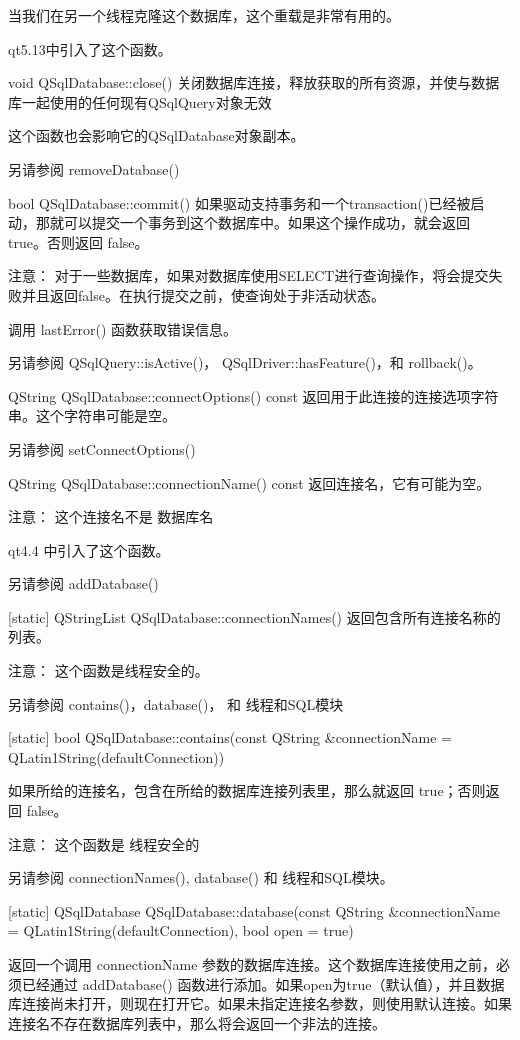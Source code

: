 当我们在另一个线程克隆这个数据库，这个重载是非常有用的。

qt5.13中引入了这个函数。

void QSqlDatabase::close()
关闭数据库连接，释放获取的所有资源，并使与数据库一起使用的任何现有QSqlQuery对象无效

这个函数也会影响它的QSqlDatabase对象副本。

另请参阅 removeDatabase()

bool QSqlDatabase::commit()
如果驱动支持事务和一个transaction()已经被启动，那就可以提交一个事务到这个数据库中。如果这个操作成功，就会返回 true。否则返回 false。

注意： 对于一些数据库，如果对数据库使用SELECT进行查询操作，将会提交失败并且返回false。在执行提交之前，使查询处于非活动状态。

调用 lastError() 函数获取错误信息。

另请参阅 QSqlQuery::isActive()， QSqlDriver::hasFeature()，和 rollback()。

QString QSqlDatabase::connectOptions() const
返回用于此连接的连接选项字符串。这个字符串可能是空。

另请参阅 setConnectOptions()

QString QSqlDatabase::connectionName() const
返回连接名，它有可能为空。

注意： 这个连接名不是 数据库名

qt4.4 中引入了这个函数。

另请参阅 addDatabase()

[static] QStringList QSqlDatabase::connectionNames()
返回包含所有连接名称的列表。

注意： 这个函数是线程安全的。

另请参阅 contains()，database()， 和 线程和SQL模块

[static] bool QSqlDatabase::contains(const QString \&connectionName = QLatin1String(defaultConnection))


如果所给的连接名，包含在所给的数据库连接列表里，那么就返回 true；否则返回 false。

注意： 这个函数是 线程安全的

另请参阅 connectionNames(), database() 和 线程和SQL模块。

[static] QSqlDatabase QSqlDatabase::database(const QString \&connectionName = QLatin1String(defaultConnection), bool open = true)


返回一个调用 connectionName 参数的数据库连接。这个数据库连接使用之前，必须已经通过 addDatabase() 函数进行添加。如果open为true（默认值），并且数据库连接尚未打开，则现在打开它。如果未指定连接名参数，则使用默认连接。如果连接名不存在数据库列表中，那么将会返回一个非法的连接。

